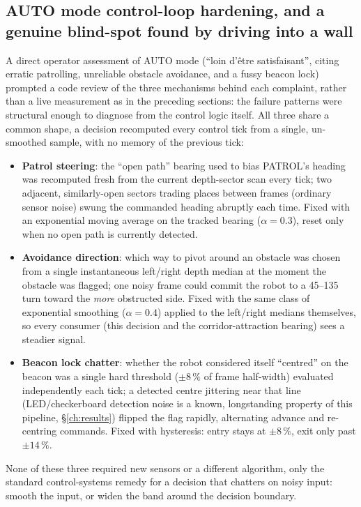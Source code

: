 \subsection{AUTO mode control-loop hardening, and a genuine blind-spot found by driving into a wall}
\label{sec:automode}
A direct operator assessment of AUTO mode (``loin d'\^etre satisfaisant'',
citing erratic patrolling, unreliable obstacle avoidance, and a fussy
beacon lock) prompted a code review of the three mechanisms behind each
complaint, rather than a live measurement as in the preceding sections:
the failure patterns were structural enough to diagnose from the control
logic itself. All three share a common shape, a decision recomputed every
control tick from a single, un-smoothed sample, with no memory of the
previous tick:
\begin{itemize}[leftmargin=1.4em]
  \item \textbf{Patrol steering}: the ``open path'' bearing used to bias
    PATROL's heading was recomputed fresh from the current depth-sector
    scan every tick; two adjacent, similarly-open sectors trading places
    between frames (ordinary sensor noise) swung the commanded heading
    abruptly each time. Fixed with an exponential moving average on the
    tracked bearing ($\alpha=0.3$), reset only when no open path is
    currently detected.
  \item \textbf{Avoidance direction}: which way to pivot around an
    obstacle was chosen from a single instantaneous left/right depth
    median at the moment the obstacle was flagged; one noisy frame could
    commit the robot to a 45--135\textdegree{} turn toward the \emph{more}
    obstructed side. Fixed with the same class of exponential smoothing
    ($\alpha=0.4$) applied to the left/right medians themselves, so every
    consumer (this decision and the corridor-attraction bearing) sees a
    steadier signal.
  \item \textbf{Beacon lock chatter}: whether the robot considered itself
    ``centred'' on the beacon was a single hard threshold
    ($\pm 8\,\%$ of frame half-width) evaluated independently each tick;
    a detected centre jittering near that line (LED/checkerboard
    detection noise is a known, longstanding property of this pipeline,
    \S\ref{ch:results}) flipped the flag rapidly, alternating
    advance and re-centring commands. Fixed with hysteresis: entry stays
    at $\pm 8\,\%$, exit only past $\pm 14\,\%$.
\end{itemize}
None of these three required new sensors or a different algorithm, only
the standard control-systems remedy for a decision that chatters on noisy
input: smooth the input, or widen the band around the decision boundary.

